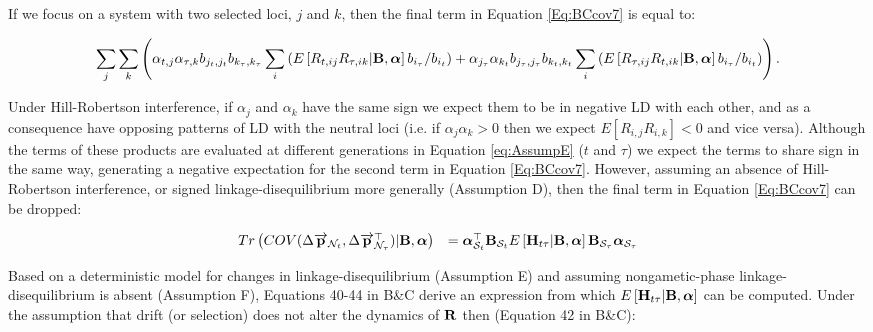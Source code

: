 \documentclass[12pt]{article}
\begin{document}
\begin{bibunit}
If we focus on a system with two selected loci, $j$ and $k$, then the final term in Equation \ref{Eq:BCcov7} is equal to:
\begin{tiny}
\begin{equation}
\sum_j\sum_k\left(\alpha_{t,j}\alpha_{{\tau,k}}b_{j_t,j_t}b_{k_{\tau},k_{\tau}}\sum _i \left(E\left[R_{t,ij}R_{{\tau},ik} | {\bf B}, \boldsymbol{\alpha}\right]b_{i_\tau}/b_{i_t}\right)+\alpha_{j_{\tau}}\alpha_{k_t}b_{j_{\tau},j_{\tau}}b_{k_t,k_t}\sum _i \left(E\left[R_{{\tau},ij}R_{t,ik} | {\bf B}, \boldsymbol{\alpha}\right]b_{i_\tau}/b_{i_t}\right)\right).
\label{eq:AssumpE}
\end{equation}
\end{tiny}

Under Hill-Robertson interference, if $\alpha_j$ and $\alpha_k$ have the same sign we expect them to be in negative LD with each other, and as a consequence have opposing patterns of LD with the neutral loci (i.e. if $\alpha_j\alpha_k>0$ then we expect $E[R_{i,j}R_{i,k}]<0$ and vice versa). Although the terms of these products are evaluated at different generations in Equation \ref{eq:AssumpE} ($t$ and $\tau$) we expect the terms to share sign in the same way, generating a negative expectation for the second term in Equation \ref{Eq:BCcov7}.  However, assuming an absence of Hill-Robertson interference, or signed linkage-disequilibrium more generally (Assumption D), then the final term in Equation \ref{Eq:BCcov7} can be dropped:

\begin{equation}
\begin{array}{rl}
Tr\left(COV(\Delta \overrightarrow{\bf p}_{{\mathcal N}_t}, \Delta \overrightarrow{\bf p}_{{\mathcal N}_{\tau}}^\top) | {\bf B}, \boldsymbol{\alpha}\right)&=
\boldsymbol{\alpha}_{{\mathcal S}_t}^{\top}{\bf B}_{{\mathcal S}_t}E\left[{\bf H}_{t\tau} | {\bf B}, \boldsymbol{\alpha}\right]{\bf B}_{{\mathcal S}_{\tau}}\boldsymbol{\alpha}_{{\mathcal S}_{\tau}}
\end{array}
\label{Eq:BCcov8}
\end{equation}

Based on a deterministic model for changes in linkage-disequilibrium (Assumption E) and assuming nongametic-phase linkage-disequilibrium is absent (Assumption F), Equations 40-44 in B\&C derive an expression from which $E\left[{\bf H}_{t\tau} | {\bf B}, \boldsymbol{\alpha}\right]$ can be computed. Under the assumption that drift (or selection) does not alter the dynamics of ${\bf R}$ then (Equation 42 in B\&C):


\end{bibunit}
\end{document}
